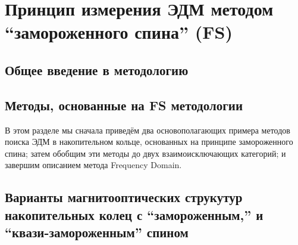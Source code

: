 \chapter{Принцип измерения ЭДМ методом ``замороженного спина'' (FS)}\label{chpt1:top-level}

\section{Общее введение в методологию}\label{chpt1:FS-introduction}


\section{Методы, основанные на FS методологии}\label{chpt1:FS-methods}
В этом разделе мы сначала приведём два основополагающих примера методов поиска ЭДМ
в накопительном кольце, основанных на принципе замороженного спина;
затем обобщим  эти методы до двух взаимоисключающих категорий;
и завершим описанием метода Frequency Domain.



\section{Варианты магнитооптических струкутур накопительных колец с ``замороженным,'' и ``квази-замороженным'' спином} \label{chpt1:Lattices}



\clearpage
